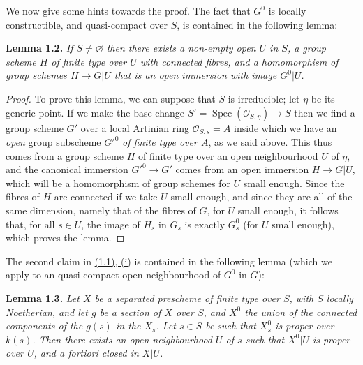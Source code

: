 \documentclass{article}
\newenvironment{itenv}[1]
  {\phantomsection\par\smallskip\noindent\textbf{#1.}\itshape}
  {\par\smallskip}
\newcommand{\oldpage}[1]{\marginpar{\footnotesize$\Big\vert$ \textit{p.~#1}}}
\theoremstyle{definition}
\theoremstyle{definition}
\theoremstyle{definition}
\theoremstyle{definition}
\theoremstyle{remark}
\begin{document}
We now give some hints towards the proof.
The fact that \(G^0\) is locally constructible, and quasi-compact over \(S\), is contained in the following lemma:

\leavevmode{}%
\begin{itenv}{Lemma 1.2}
If \(S\neq\varnothing\) then there exists a non-empty open \(U\) in \(S\), a group scheme \(H\) of finite type over \(U\) with connected fibres, and a homomorphism of group schemes \(H\to G|U\) that is an open immersion with image \(G^0|U\).

\end{itenv}

\begin{proof}
To prove this lemma, we can suppose that \(S\) is irreducible;
let \(\eta\) be its generic point.
If we make the base change \(S'=\operatorname{Spec}({\mathscr{O}}_{S,\eta})\to S\) then we find a group scheme \(G'\) over a local Artinian ring \({\mathscr{O}}_{S,s}=A\) inside which we have an \emph{open} group subscheme \({G'}^0\) \emph{of finite type over \(A\)}, as we said above.
This thus comes from a group scheme \(H\) of finite type over an open neighbourhood \(U\) of \(\eta\), and the canonical immersion \({G'}^0\to G'\) comes from an open immersion \(H\to G|U\), which will be a homomorphism of group schemes for \(U\) small enough.
\oldpage{236-05}Since the fibres of \(H\) are connected if we take \(U\) small enough, and since they are all of the same dimension, namely that of the fibres of \(G\), for \(U\) small enough, it follows that, for all \(s\in U\), the image of \(H_s\) in \(G_s\) is exactly \(G_s^0\) (for \(U\) small enough), which proves the lemma.
\end{proof}

The second claim in \protect\hyperlink{fga-3-vi-theorem-1.1}{(1.1), (i)} is contained in the following lemma (which we apply to an quasi-compact open neighbourhood of \(G^0\) in \(G\)):

\leavevmode{}%
\begin{itenv}{Lemma 1.3}
Let \(X\) be a separated prescheme of finite type over \(S\), with \(S\) locally Noetherian, and let \(g\) be a section of \(X\) over \(S\), and \(X^0\) the union of the connected components of the \(g(s)\) in the \(X_s\).
Let \(s\in S\) be such that \(X_s^0\) is proper over \(k(s)\).
Then there exists an open neighbourhood \(U\) of \(s\) such that \(X^0|U\) is proper over \(U\), and a fortiori closed in \(X|U\).

\end{itenv}
\end{document}
